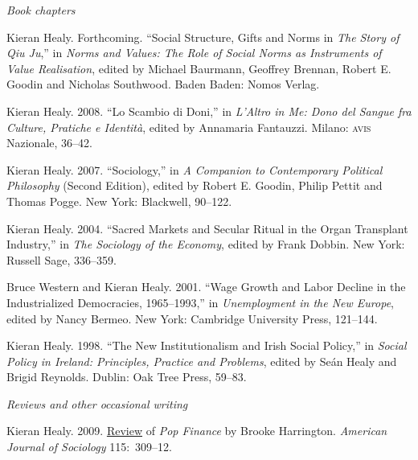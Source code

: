 \documentclass[11pt]{article}
\begin{document}
\bigskip

\noindent\emph{Book chapters \vspace{0.05in}}

\ind Kieran Healy. Forthcoming. ``Social Structure, Gifts and Norms in \emph{The Story of Qiu Ju},'' in \emph{Norms and Values: The Role of Social Norms as Instruments of Value Realisation}, edited by Michael Baurmann, Geoffrey Brennan, Robert E. Goodin and Nicholas Southwood. Baden Baden: Nomos Verlag.

\ind Kieran Healy. 2008. ``Lo Scambio di Doni,'' in \emph{L'Altro in Me: Dono del Sangue fra Culture, Pratiche e Identità}, edited by Annamaria Fantauzzi. Milano: \textsc{avis} Nazionale, 36--42. 

\ind Kieran Healy. 2007. ``Sociology,'' in \emph{A Companion to Contemporary Political Philosophy} (Second Edition), edited by Robert E. Goodin, Philip Pettit and Thomas Pogge. New York: Blackwell, 90--122. 

\ind  Kieran Healy. 2004. ``Sacred Markets and Secular Ritual in the Organ Transplant
Industry,'' in \emph{The Sociology of the Economy}, edited by Frank Dobbin. New
York: Russell Sage, 336--359.

\ind Bruce Western and Kieran Healy.  2001.  ``Wage Growth and Labor Decline in the
Industrialized Democracies, 1965--1993,'' in \emph{Unemployment in the New
  Europe}, edited by Nancy Bermeo. New York: Cambridge University Press,
121--144.

 \ind  Kieran Healy. 1998. ``The New Institutionalism and Irish Social Policy,'' in
\emph{Social Policy in Ireland: Principles, Practice and Problems}, edited by
Se\'{a}n Healy and Brigid Reynolds. Dublin: Oak Tree Press, 59--83.


\bigskip 
 
\noindent\emph{Reviews and other occasional writing \vspace{0.05in}}

\ind Kieran Healy. 2009. \href{http://www.journals.uchicago.edu/doi/pdf/10.1086/605757}{Review} of \emph{Pop Finance} by Brooke Harrington. \emph{American Journal of Sociology} 115:~309--12.
\end{document}
